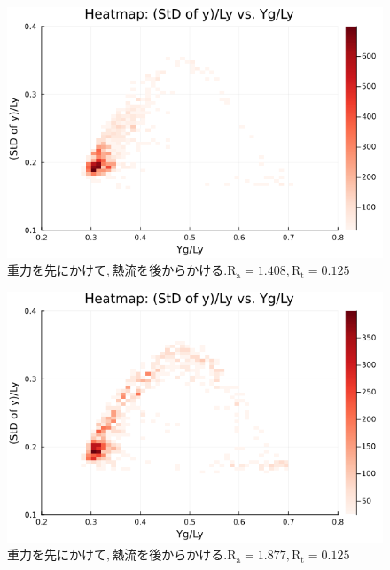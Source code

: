 \begin{figure}[H]
  \centering
  \includegraphics[scale=0.6]{image/RaRtmap_drop_heat/2023-12-21T10:44:57.746_RaRtmap_chi1.265_Ay50_rho0.4_T0.43_dT0.04_Rd0.0_Rt0.125_Ra1.4081535_g0.0003999718779659611_run4.0e7.png}
  \caption{$重力を先にかけて, 熱流を後からかける. \text{R}_\text{a}=1.408,\text{R}_\text{t}=0.125$}
  \label{}
\end{figure}

\begin{figure}[H]
  \centering
  \includegraphics[scale=0.6]{image/RaRtmap_drop_heat/2023-12-21T10:44:57.821_RaRtmap_chi1.265_Ay50_rho0.4_T0.43_dT0.04_Rd0.0_Rt0.125_Ra1.877538_g0.0003999718779659611_run4.0e7.png}
  \caption{$重力を先にかけて, 熱流を後からかける. \text{R}_\text{a}=1.877,\text{R}_\text{t}=0.125$}
  \label{}
\end{figure}

